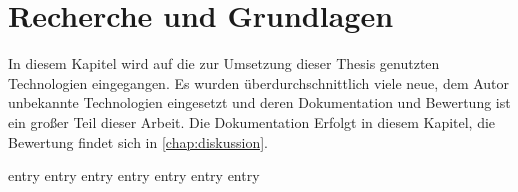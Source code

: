 \chapter{Recherche und Grundlagen}
\label{chap:grundlagen}

In diesem Kapitel wird auf die zur Umsetzung dieser Thesis genutzten
Technologien eingegangen.  Es wurden überdurchschnittlich viele neue, dem Autor
unbekannte Technologien eingesetzt und deren Dokumentation und Bewertung ist
ein großer Teil dieser Arbeit.  Die Dokumentation Erfolgt in diesem Kapitel,
die Bewertung findet sich in \cref{chap:diskussion}.

{entry}
{entry}
{entry}
{entry}
{entry}
{entry}
{entry}
